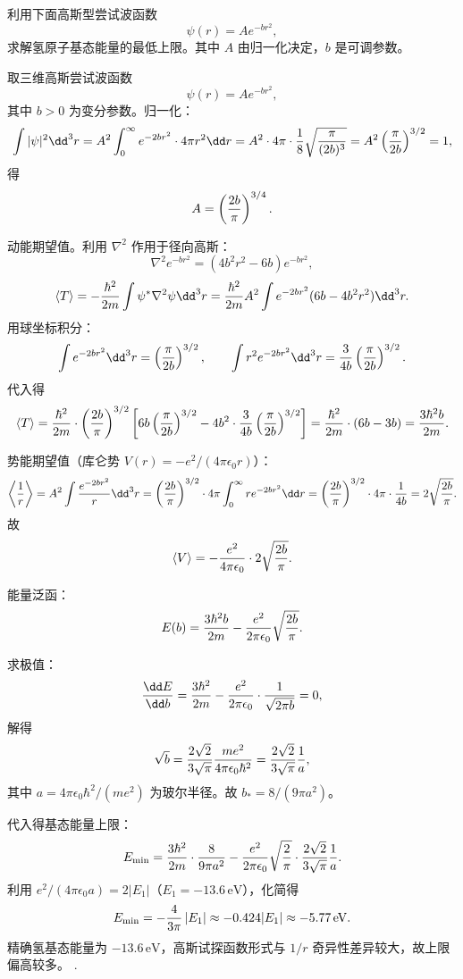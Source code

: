 \begin{question}
利用下面高斯型尝试波函数
\[
\psi(r)=Ae^{-br^2},
\]
求解氢原子基态能量的最低上限。其中 $A$ 由归一化决定，$b$ 是可调参数。
\end{question}
\begin{solution}
取三维高斯尝试波函数
\[
\psi(r)=A e^{-b r^2},
\]
其中 $b>0$ 为变分参数。归一化：
\[
\int|\psi|^2\dd^3r=A^2\int_0^\infty e^{-2br^2}\cdot4\pi r^2\dd r
=A^2\cdot4\pi\cdot{1\over8}\sqrt{\pi\over(2b)^3}
=A^2\left({\pi\over2b}\right)^{3/2}=1,
\]
得
\[
A=\left({2b\over\pi}\right)^{3/4}.
\]

动能期望值。利用 $\nabla^2$ 作用于径向高斯：
\[
\nabla^2 e^{-br^2}=\left(4b^2r^2-6b\right)e^{-br^2},
\]
\[
\langle T\rangle=-{\hbar^2\over2m}\int\psi^*\nabla^2\psi\dd^3r
={\hbar^2\over2m}A^2\int e^{-2br^2}(6b-4b^2r^2)\dd^3r.
\]
用球坐标积分：
\[
\int e^{-2br^2}\dd^3r=\left({\pi\over2b}\right)^{3/2},\qquad
\int r^2 e^{-2br^2}\dd^3r={3\over4b}\left({\pi\over2b}\right)^{3/2}.
\]
代入得
\[
\langle T\rangle={\hbar^2\over2m}\cdot\left({2b\over\pi}\right)^{3/2}
\left[6b\left({\pi\over2b}\right)^{3/2}-4b^2\cdot{3\over4b}\left({\pi\over2b}\right)^{3/2}\right]
={\hbar^2\over2m}\cdot(6b-3b)={3\hbar^2b\over2m}.
\]

势能期望值（库仑势 $V(r)=-e^2/(4\pi\epsilon_0 r)$）：
\[
\left\langle{1\over r}\right\rangle=A^2\int{e^{-2br^2}\over r}\dd^3r
=\left({2b\over\pi}\right)^{3/2}\cdot4\pi\int_0^\infty r e^{-2br^2}\dd r
=\left({2b\over\pi}\right)^{3/2}\cdot4\pi\cdot{1\over4b}
=2\sqrt{2b\over\pi}.
\]
故
\[
\langle V\rangle=-{e^2\over4\pi\epsilon_0}\cdot2\sqrt{2b\over\pi}.
\]

能量泛函：
\[
E(b)={3\hbar^2b\over2m}-{e^2\over2\pi\epsilon_0}\sqrt{2b\over\pi}.
\]

求极值：
\[
{\dd E\over\dd b}={3\hbar^2\over2m}-{e^2\over2\pi\epsilon_0}\cdot{1\over\sqrt{2\pi b}}=0,
\]
解得
\[
\sqrt b={2\sqrt2\over3\sqrt\pi}{me^2\over4\pi\epsilon_0\hbar^2}={2\sqrt2\over3\sqrt\pi}{1\over a},
\]
其中 $a=4\pi\epsilon_0\hbar^2/(me^2)$ 为玻尔半径。故 $b_*=8/(9\pi a^2)$。

代入得基态能量上限：
\[
E_{\min}={3\hbar^2\over2m}\cdot{8\over9\pi a^2}-{e^2\over2\pi\epsilon_0}\sqrt{2\over\pi}\cdot{2\sqrt2\over3\sqrt\pi}{1\over a}.
\]
利用 $e^2/(4\pi\epsilon_0 a)=2|E_1|$（$E_1=-13.6\,\mathrm{eV}$），化简得
\[
E_{\min}=-{4\over3\pi}\,|E_1|\approx-0.424|E_1|\approx-5.77\,\mathrm{eV}.
\]
精确氢基态能量为 $-13.6\,\mathrm{eV}$，高斯试探函数形式与 $1/r$ 奇异性差异较大，故上限偏高较多。
.
\end{solution}

